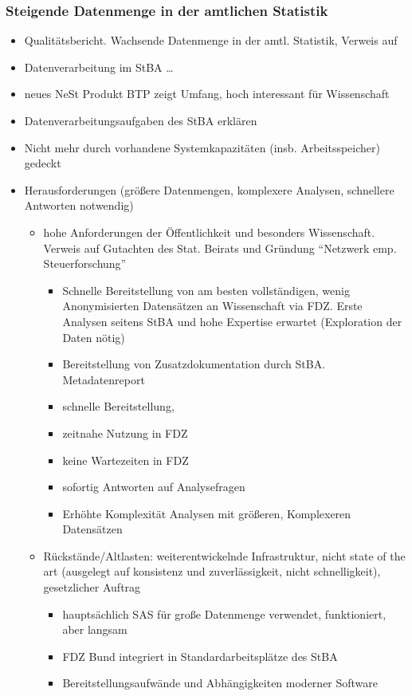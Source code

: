 \documentclass[
  german,
  10pt,
  twoside]{article}
\providecommand{\tightlist}{%
  \setlength{\itemsep}{0pt}\setlength{\parskip}{0pt}}
\begin{document}
\subsubsection{Steigende Datenmenge in der amtlichen
Statistik}\label{steigende-datenmenge-in-der-amtlichen-statistik}

\begin{itemize}
\item
  Qualitätsbericht. Wachsende Datenmenge in der amtl. Statistik, Verweis
  auf \autocite{destatis2023}
\item
  Datenverarbeitung im StBA \ldots{}
\item
  neues NeSt Produkt BTP zeigt Umfang, hoch interessant für Wissenschaft
\item
  Datenverarbeitungsaufgaben des StBA erklären
\item
  Nicht mehr durch vorhandene Systemkapazitäten (insb. Arbeitsspeicher)
  gedeckt
\item
  Herausforderungen (größere Datenmengen, komplexere Analysen,
  schnellere Antworten notwendig)

  \begin{itemize}
  \tightlist
  \item
    hohe Anforderungen der Öffentlichkeit und besonders Wissenschaft.
    Verweis auf Gutachten des Stat. Beirats und Gründung ``Netzwerk emp.
    Steuerforschung''

    \begin{itemize}
    \tightlist
    \item
      Schnelle Bereitstellung von am besten vollständigen, wenig
      Anonymisierten Datensätzen an Wissenschaft via FDZ. Erste Analysen
      seitens StBA und hohe Expertise erwartet (Exploration der Daten
      nötig)
    \item
      Bereitstellung von Zusatzdokumentation durch StBA. Metadatenreport
    \item
      schnelle Bereitstellung,
    \item
      zeitnahe Nutzung in FDZ
    \item
      keine Wartezeiten in FDZ
    \item
      sofortig Antworten auf Analysefragen
    \item
      Erhöhte Komplexität Analysen mit größeren, Komplexeren Datensätzen
    \end{itemize}
  \item
    Rückstände/Altlasten: weiterentwickelnde Infrastruktur, nicht state
    of the art (ausgelegt auf konsistenz und zuverlässigkeit, nicht
    schnelligkeit), gesetzlicher Auftrag

    \begin{itemize}
    \tightlist
    \item
      hauptsächlich SAS für große Datenmenge verwendet, funktioniert,
      aber langsam
    \item
      FDZ Bund integriert in Standardarbeitsplätze des StBA
    \item
      Bereitstellungsaufwände und Abhängigkeiten moderner Software
    \end{itemize}
  \end{itemize}
\end{itemize}
\end{document}
